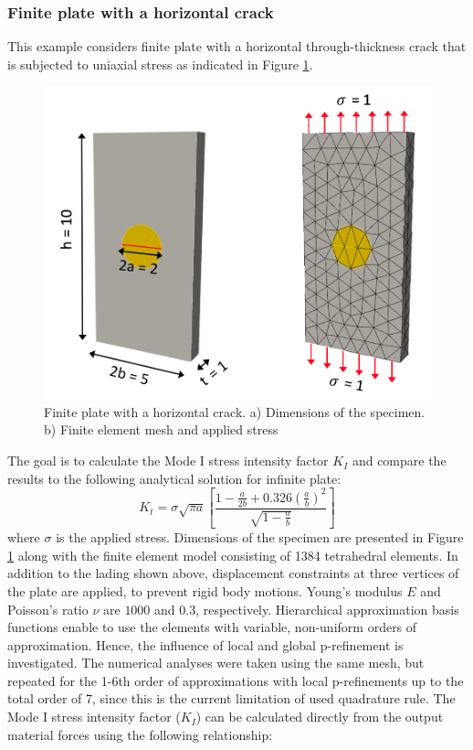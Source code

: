 \documentclass[11pt]{acmeArticle}
\numberwithin{equation}{section}
\begin{document}
\subsubsection{Finite plate with a horizontal crack}\label{sec:plate_section}
This example considers finite plate with a horizontal through-thickness crack that is subjected to uniaxial stress as indicated in Figure \ref{fig:plate_load_mesh}. 
\begin{figure}
	\centering
	\includegraphics[width=0.5\linewidth]{Figures/plate_load_mesh.png}
	\caption{Finite plate with a horizontal crack. a) Dimensions of the specimen. b) Finite element mesh and applied stress}
	\label{fig:plate_load_mesh}
\end{figure}
The goal is to calculate the Mode I stress intensity factor $ K_I $ and compare the results to the following analytical solution \citep{rooke1976compendium} for infinite plate:
\begin{equation}\label{eq:frac_analytical}
K_t=\sigma \sqrt{\pi a} \left[  \frac{1 - \frac{a}{2b} + 0.326 (\frac{a}{b})^2 }{\sqrt{1-\frac{a}{b}}}  \right]
\end{equation}
where $\sigma $ is the applied stress. Dimensions of the specimen are presented in Figure \ref{fig:plate_load_mesh} along with the finite element model consisting of 1384 tetrahedral elements. In addition to the lading shown above, displacement constraints at three vertices of the plate are applied, to prevent rigid body motions. Young's modulus $E$ and Poisson's ratio $\nu$ are $1000$ and $0.3$, respectively. 
Hierarchical approximation basis functions enable to use the elements with variable, non-uniform orders of approximation. Hence, the influence of local and global p-refinement is investigated. The numerical analyses were taken using the same mesh, but repeated for the 1-6th order of approximations with local p-refinements up to the total order of 7, since this is the current limitation of used quadrature rule. The Mode I stress intensity factor ($K_I$) can be calculated directly from the output material forces using the following relationship: 
\end{document}
